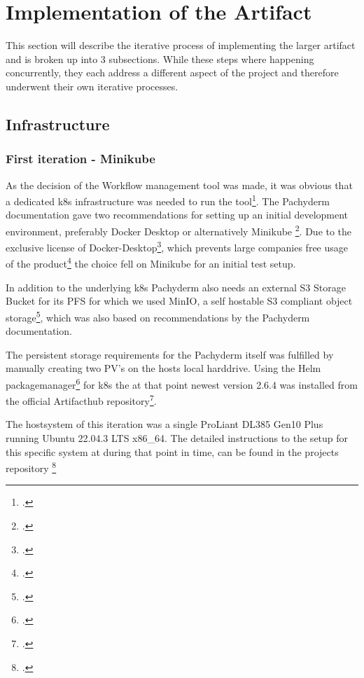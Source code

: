 \section{Implementation of the Artifact}

This section will describe the iterative process of implementing the larger artifact and is broken up into 3 subsections.
While these steps where happening concurrently, they each address a different aspect of the project and therefore underwent their own iterative processes.



\subsection{Infrastructure}


\subsubsection{First iteration - Minikube}
As the decision of the Workflow management tool was made, it was obvious that a dedicated \ac{k8s} infrastructure was needed to run the tool\footcite{PachydermDocsOnPrem}.
The Pachyderm documentation gave two recommendations for setting up an initial development environment, preferably Docker Desktop or alternatively Minikube \footcite{PachydermDocsLocal}.
Due to the exclusive license of Docker-Desktop\footcite{DockerTermsService2022},
which prevents large companies free usage of the product\footcite{DockerFAQsDocker2021} the choice fell on Minikube for an initial test setup.

In addition to the underlying \ac{k8s} Pachyderm also needs an external S3 Storage Bucket for its \ac{PFS} for which we used MinIO,
a self hostable S3 compliant object storage\footcite{incMinIOMinIOKubernetes}, which was also based on recommendations by the Pachyderm documentation.

The persistent storage requirements for the Pachyderm itself was fulfilled by manually creating two \ac{PV}'s on the hosts local harddrive.
Using the Helm packagemanager\footcite{HelmDocsHome} for \ac{k8s} the at that point newest version 2.6.4 was installed from the official Artifacthub repository\footcite{ArtifacthubPachyderm}.

The hostsystem of this iteration was a single ProLiant DL385 Gen10 Plus running Ubuntu 22.04.3 LTS x86\_64.
The detailed instructions to the setup for this specific system at during that point in time,
can be found in the projects repository \footcite{eckerthInstallationInstructionsMinikube}


